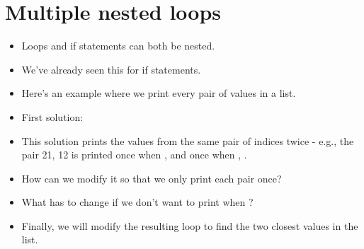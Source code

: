 \documentclass[letterpaper,10pt,english]{sphinxmanual}
\begin{document}
\section{Multiple nested loops}
\label{\detokenize{lecture_notes/lec09_loops1_while:multiple-nested-loops}}\begin{itemize}
\item {} 
Loops and if statements can both be nested.

\item {} 
We’ve already seen this for if statements.

\item {} 
Here’s an example where we print every pair of values in a list.

\item {} 
First solution:

\begin{sphinxVerbatim}[commandchars=\\\{\}]
  \PYG{p}{[}     \PYG{p}{]}
  
   
      
       
        \PYG{p}{[}\PYG{p}{]} \PYG{p}{[}\PYG{p}{]}
          
      
\end{sphinxVerbatim}

\item {} 
This solution prints the values from the same pair of indices twice
-  e.g., the pair 21, 12 is printed once when ,  and
once when , .

\item {} 
How can we modify it so that we only print each pair once?

\item {} 
What has to change if we don’t want to print when ?

\item {} 
Finally, we will modify the resulting loop to find the two closest
values in the list.

\end{itemize}
\end{document}
